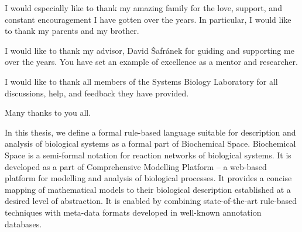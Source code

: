 \documentclass[12pt]{fithesis2}
\begin{document}
\FrontMatter
\ThesisTitlePage

\begin{ThesisDeclaration}
\DeclarationText
\AdvisorName
\end{ThesisDeclaration}

\begin{ThesisThanks}
I would especially like to thank my amazing family for the love, support, and constant encouragement I have gotten over the years. 
 In particular, I would like to thank my parents and my brother.

\bigskip

\noindent I would like to thank my advisor, David Šafránek for guiding and 
supporting me over the years. You have set an example of excellence as a mentor and researcher.

\bigskip

\noindent  I would like to thank all members of the Systems Biology Laboratory for all discussions, help, and feedback they have provided.  

\bigskip

\noindent Many thanks to you all.

\end{ThesisThanks}

\begin{ThesisAbstract}
In this thesis, we define a formal rule-based language suitable for description and analysis of biological systems as a formal part of Biochemical Space. Biochemical Space is a semi-formal notation for reaction networks of biological systems. It is developed as a part of Comprehensive Modelling Platform -- a web-based platform for modelling and analysis of biological processes. It provides a concise mapping of mathematical models to their biological description established at a desired level of abstraction. It is enabled by combining state-of-the-art rule-based techniques with meta-data formats developed in well-known annotation databases.
\end{ThesisAbstract}


\end{document}
